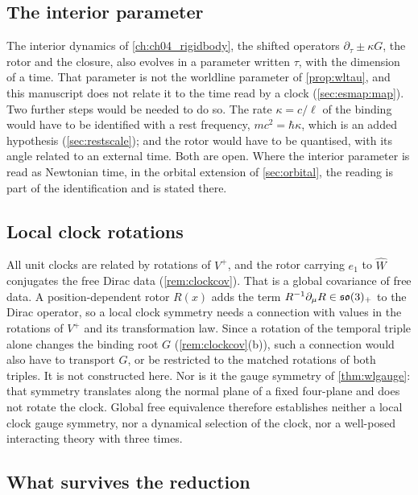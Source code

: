 \subsection{The interior parameter}

The interior dynamics of \cref{ch:ch04_rigidbody}, the shifted operators $\partial_\tau\pm\kappa G$, the rotor and the closure, also evolves in a
parameter written $\tau$, with the dimension of a time. That parameter is not the worldline parameter of \cref{prop:wltau}, and this
manuscript does not relate it to the time read by a clock (\cref{sec:esmap:map}). Two further steps would be needed to do so. The rate
$\kappa=c/\ell$ of the binding would have to be identified with a rest frequency, $mc^2=\hbar\kappa$, which is an added hypothesis
(\cref{sec:restscale}); and the rotor would have to be quantised, with its angle related to an external time. Both are open. Where the
interior parameter is read as Newtonian time, in the orbital extension of \cref{sec:orbital}, the reading is part of the identification and is
stated there.

\subsection{Local clock rotations}
\label{sec:localclock}

All unit clocks are related by rotations of $V^+$, and the rotor carrying $e_1$ to $\widehat W$ conjugates the free Dirac data (\cref{rem:clockcov}).
That is a global covariance of free data. A position-dependent rotor $R(x)$ adds the term $R^{-1}\partial_\mu R\in\mathfrak{so}(3)_+$ to the Dirac operator, so a
local clock symmetry needs a connection with values in the rotations of $V^+$ and its transformation law. Since a rotation of the temporal triple
alone changes the binding root $G$ (\cref{rem:clockcov}(b)), such a connection would also have to transport $G$, or be restricted to the matched
rotations of both triples. It is not constructed here. Nor is it the gauge symmetry of \cref{thm:wlgauge}: that symmetry translates
along the normal plane of a fixed four-plane and does not rotate the clock. Global free equivalence therefore establishes neither a local clock
gauge symmetry, nor a dynamical selection of the clock, nor a well-posed interacting theory with three times.

\subsection{What survives the reduction}


